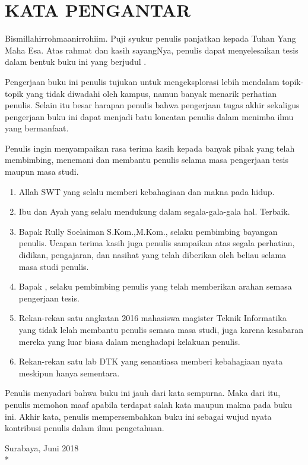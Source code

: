 \chapter {KATA PENGANTAR}

Bismillahirrohmaanirrohiim. Puji syukur penulis panjatkan kepada Tuhan Yang Maha Esa. Atas rahmat dan kasih sayangNya, penulis dapat menyelesaikan tesis dalam bentuk buku ini yang berjudul \textbf{\judul}.

Pengerjaan buku ini penulis tujukan untuk mengeksplorasi lebih mendalam topik-topik yang tidak diwadahi oleh kampus, namun banyak menarik perhatian penulis. Selain itu besar harapan penulis bahwa pengerjaan tugas akhir sekaligus pengerjaan buku ini dapat menjadi batu loncatan penulis dalam menimba ilmu yang bermanfaat.

Penulis ingin menyampaikan rasa terima kasih kepada banyak pihak yang telah membimbing, menemani dan membantu penulis selama masa pengerjaan tesis maupun masa studi.

\begin {enumerate}
  \item Allah SWT yang selalu memberi kebahagiaan dan makna pada hidup.
  \item Ibu dan Ayah yang selalu mendukung dalam segala-gala-gala hal. Terbaik.
  \item Bapak Rully Soelaiman S.Kom.,M.Kom., selaku pembimbing bayangan penulis. Ucapan terima kasih juga penulis sampaikan atas segala perhatian, didikan, pengajaran, dan nasihat yang telah diberikan oleh beliau selama masa studi penulis.
  \item Bapak \pembimbingsatu, selaku pembimbing penulis yang telah memberikan arahan semasa pengerjaan tesis.
  \item Rekan-rekan satu angkatan 2016 mahasiswa magister Teknik Informatika yang tidak lelah membantu penulis semasa masa studi, juga karena kesabaran mereka yang luar biasa dalam menghadapi kelakuan penulis.
  \item Rekan-rekan satu lab DTK yang senantiasa memberi kebahagiaan nyata meskipun hanya sementara.
\end {enumerate}

Penulis menyadari bahwa buku ini jauh dari kata sempurna. Maka dari itu, penulis memohon maaf apabila terdapat salah kata maupun makna pada buku ini. Akhir kata, penulis mempersembahkan buku ini sebagai wujud nyata kontribusi penulis dalam ilmu pengetahuan.

\begin{flushright}
Surabaya, Juni 2018 \\*
\vspace{5em}
\penulis
\end{flushright}